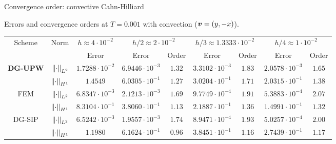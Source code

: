\begin{frame}{Convergence order: convective Cahn-Hilliard }
	\begin{table}
		\begin{center}
				\fontsize{4pt}{6pt}\selectfont
				{\footnotesize{} Errors and convergence orders at $T=0.001$ with convection ($\boldsymbol{v}=(y,-x)$).\vspace*{0.3cm}}
				\begin{tabular}{ccccccccc}
					\toprule
					\multirow{2}[2]{*}{Scheme} & \multirow{2}[2]{*}{Norm}& $h\approx 4\cdot 10^{-2}$ & \multicolumn{2}{c}{$h/2\approx 2\cdot 10^{-2} $} & \multicolumn{2}{c}{$h/3\approx 1.3333\cdot 10^{-2}$} &\multicolumn{2}{c}{$h/4\approx 1\cdot 10^{-2}$} \\
					\cline{3-9}
					&&Error &Error & Order &  Error & Order &  Error & Order \\
					\midrule
					\multirow{2}[2]{*}{\textbf{DG-UPW}} & $\left\|\cdot\right\|_{L^2}$ &$1.7288\cdot 10^{-2}$  &$6.9446\cdot 10^{-3}$ & $1.32$  &$3.3102\cdot 10^{-3}$ & $1.83$  &$2.0578\cdot 10^{-3}$ & $1.65$   \\
					\cline{2-9}
					& $\left\|\cdot\right\|_{H^1}$ &$1.4549$ &$6.0305\cdot 10^{-1}$ & $1.27$ &$3.0204\cdot 10^{-1}$ & $1.71$ &$2.0315\cdot 10^{-1}$ & $1.38$  \\
					\midrule
					\multirow{2}[2]{*}{FEM}  & $\left\|\cdot\right\|_{L^2}$ &$6.8347\cdot 10^{-3}$  &$2.1213\cdot 10^{-3}$  & $1.69$  &$9.7749\cdot 10^{-4}$ & $1.91$  &$5.3883\cdot 10^{-4}$ & $2.07$ \\
					\cline{2-9}
					& $\left\|\cdot\right\|_{H^1}$ &$8.3104\cdot 10^{-1}$  &$3.8060\cdot 10^{-1}$  & $1.13$  &$2.1887\cdot 10^{-1}$ & $1.36$ &$1.4991\cdot 10^{-1}$ & $1.32$  \\
					\midrule
					\multirow{2}[2]{*}{DG-SIP}  & $\left\|\cdot\right\|_{L^2}$ &$6.5242\cdot 10^{-3}$  & $1.9557\cdot 10^{-3}$  & $1.74$ &$8.9471\cdot 10^{-4}$  & $1.93$ &$5.0257\cdot 10^{-4}$ & $2.00$ \\
					\cline{2-9}
					& $\left\|\cdot\right\|_{H^1}$ &$1.1980$ &$6.1624\cdot 10^{-1}$  & $0.96$ &$3.8451\cdot 10^{-1}$  & $1.16$ &$2.7439\cdot 10^{-1}$ &$1.17$ \\
					\bottomrule
				\end{tabular}
		\end{center}
	\end{table}
\end{frame}


